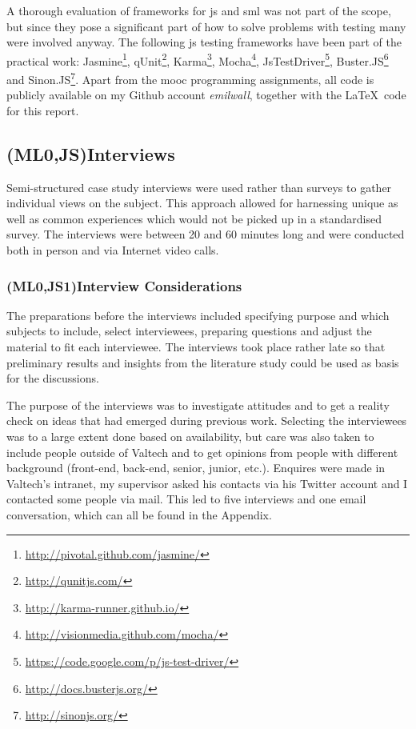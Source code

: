 \documentclass[11pt]{article}
\begin{document}
A thorough evaluation of frameworks for \gls{js} and \gls{sml} was not part of the scope, but since they pose a significant part of how to solve problems with testing many were involved anyway. The following \gls{js} testing frameworks have been part of the practical work:
Jasmine\footnote{\url{http://pivotal.github.com/jasmine/}},
qUnit\footnote{\url{http://qunitjs.com/}},
Karma\footnote{\url{http://karma-runner.github.io/}},
Mocha\footnote{\url{http://visionmedia.github.com/mocha/}},
JsTestDriver\footnote{\url{https://code.google.com/p/js-test-driver/}},
Buster.JS\footnote{\url{http://docs.busterjs.org/}} and
Sinon.JS\footnote{\url{http://sinonjs.org/}}. Apart from the \gls{mooc} programming assignments, all code is publicly available on my Github account \emph{emilwall}, together with the \LaTeX~code for this report.

\subsection{(ML0,JS)Interviews}

Semi-structured case study interviews were used rather than surveys to gather individual views on the subject. This approach allowed for harnessing unique as well as common experiences which would not be picked up in a standardised survey. The interviews were between 20 and 60 minutes long and were conducted both in person and via Internet video calls.

\subsubsection{(ML0,JS1)Interview Considerations}

The preparations before the interviews included specifying purpose and which subjects to include, select interviewees, preparing questions and adjust the material to fit each interviewee. The interviews took place rather late so that preliminary results and insights from the literature study could be used as basis for the discussions.

The purpose of the interviews was to investigate attitudes and to get a reality check on ideas that had emerged during previous work. Selecting the interviewees was to a large extent done based on availability, but care was also taken to include people outside of Valtech and to get opinions from people with different background (front-end, back-end, senior, junior, etc.). Enquires were made in Valtech's intranet, my supervisor asked his contacts via his Twitter account and I contacted some people via mail. This led to five interviews and one email conversation, which can all be found in the Appendix.
\end{document}
